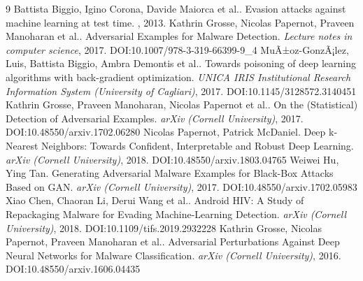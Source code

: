\documentclass[11pt]{article}
\begin{document}
\begin{thebibliography}{9}
 Battista Biggio, Igino Corona, Davide Maiorca et al.. Evasion attacks against machine learning at test time. \emph{}, 2013. 
 Kathrin Grosse, Nicolas Papernot, Praveen Manoharan et al.. Adversarial Examples for Malware Detection. \emph{Lecture notes in computer science}, 2017. DOI:10.1007/978-3-319-66399-9\_4
 MuÃ±oz-GonzÃ¡lez, Luis, Battista Biggio, Ambra Demontis et al.. Towards poisoning of deep learning algorithms with back-gradient optimization. \emph{UNICA IRIS Institutional Research Information System (University of Cagliari)}, 2017. DOI:10.1145/3128572.3140451
 Kathrin Grosse, Praveen Manoharan, Nicolas Papernot et al.. On the (Statistical) Detection of Adversarial Examples. \emph{arXiv (Cornell University)}, 2017. DOI:10.48550/arxiv.1702.06280
 Nicolas Papernot, Patrick McDaniel. Deep k-Nearest Neighbors: Towards Confident, Interpretable and Robust Deep Learning. \emph{arXiv (Cornell University)}, 2018. DOI:10.48550/arxiv.1803.04765
 Weiwei Hu, Ying Tan. Generating Adversarial Malware Examples for Black-Box Attacks Based on GAN. \emph{arXiv (Cornell University)}, 2017. DOI:10.48550/arxiv.1702.05983
 Xiao Chen, Chaoran Li, Derui Wang et al.. Android HIV: A Study of Repackaging Malware for Evading Machine-Learning Detection. \emph{arXiv (Cornell University)}, 2018. DOI:10.1109/tifs.2019.2932228
 Kathrin Grosse, Nicolas Papernot, Praveen Manoharan et al.. Adversarial Perturbations Against Deep Neural Networks for Malware Classification. \emph{arXiv (Cornell University)}, 2016. DOI:10.48550/arxiv.1606.04435
\end{thebibliography}
\end{document}
